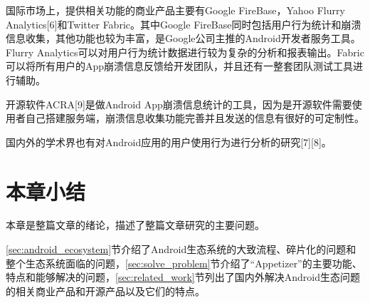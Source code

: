 国际市场上，提供相关功能的商业产品主要有Google FireBase，Yahoo Flurry Analytics[6]和Twitter Fabric。其中Google FireBase同时包括用户行为统计和崩溃信息收集，其他功能也较为丰富，是Google公司主推的Android开发者服务工具。Flurry Analytics可以对用户行为统计数据进行较为复杂的分析和报表输出。Fabric可以将所有用户的App崩溃信息反馈给开发团队，并且还有一整套团队测试工具进行辅助。

开源软件ACRA[9]是做Android App崩溃信息统计的工具，因为是开源软件需要使用者自己搭建服务端，崩溃信息收集功能完善并且发送的信息有很好的可定制性。

国内外的学术界也有对Android应用的用户使用行为进行分析的研究[7][8]。

\section{本章小结}

本章是整篇文章的绪论，描述了整篇文章研究的主要问题。

\ref{sec:android_ecosystem}节介绍了Android生态系统的大致流程、碎片化的问题和整个生态系统面临的问题，\ref{sec:solve_problem}节介绍了“Appetizer”的主要功能、特点和能够解决的问题，\ref{sec:related_work}节列出了国内外解决Android生态问题的相关商业产品和开源产品以及它们的特点。
